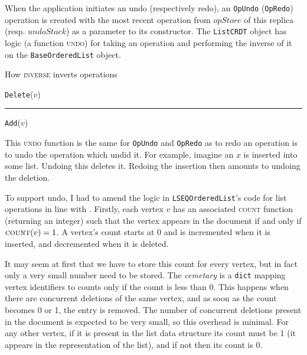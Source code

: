 \documentclass[diss.tex]{subfiles}
\begin{document}
When the application initiates an undo (respectively redo), an \texttt{OpUndo} (\texttt{OpRedo}) operation is created with the most recent operation from $opStore$ of this replica (resp. $undoStack$) as a parameter to its constructor. The \texttt{ListCRDT} object has logic (a function \textsc{undo}) for taking an operation and performing the inverse of it on the \texttt{BaseOrderedList} object.

\begin{algorithm}[H]
\caption{How \textsc{inverse} inverts operations}
\begin{algorithmic}[1]
\State \Return \texttt{Delete}($v$)

\EndFunction
\end{algorithmic}

\hrule 

\begin{algorithmic}[1]

\State \Return \texttt{Add}($v$)
\EndFunction
\end{algorithmic}
\end{algorithm}

This \textsc{undo} function is the same for \texttt{OpUndo} and \texttt{OpRedo} as to redo an operation is to undo the operation which undid it. For example, imagine an $x$ is inserted into some list. Undoing this deletes it. Redoing the insertion then amounts to undoing the deletion. 


To support undo, I had to amend the logic in \texttt{LSEQOrderedList}'s code for list operations in line with \cite{logootundo}. Firstly, each vertex $v$ has an associated \textsc{count} function (returning an integer) such that the vertex appears in the document if and only if $\textsc{count}(v) = 1$. A vertex's count starts at 0 and is incremented when it is inserted, and decremented when it is deleted.

It may seem at first that we have to store this count for every vertex, but in fact only a very small number need to be stored. The \textit{cemetary} is a \texttt{dict} mapping vertex identifiers to counts only if the count is less than 0. This happens when there are concurrent deletions of the same vertex, and as soon as the count becomes 0 or 1, the entry is removed. The number of concurrent deletions present in the document is expected to be very small, so this overhead is minimal. For any other vertex, if it is present in the list data structure its count must be 1 (it appears in the representation of the list), and if not then its count is 0.
\end{document}
